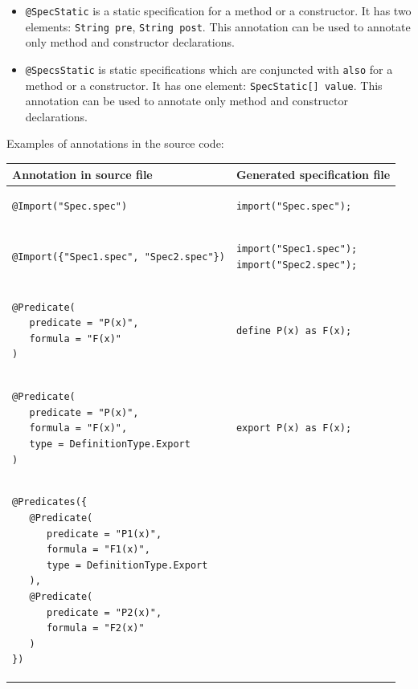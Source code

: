 \documentclass{article}
\begin{document}
\begin{itemize}
\item \texttt{@SpecStatic} is a static specification for a method or a constructor. It has two elements: \texttt{String pre}, \texttt{String post}. This annotation can be used to annotate only method and constructor declarations.
\item \texttt{@SpecsStatic} is static specifications which are conjuncted with \texttt{also} for a method or a constructor. It has one element: \texttt{SpecStatic[] value}. This annotation can be used to annotate only method and constructor declarations.
\end{itemize}


Examples of annotations in the source code:\\
\begin{longtable}{ m{7cm} | m{5cm} }
Annotation in source file & Generated specification file \\
\hline
\begin{verbatim}
@Import("Spec.spec")
\end{verbatim}
& 
\begin{verbatim}
import("Spec.spec");
\end{verbatim}
\\
\begin{verbatim}
@Import({"Spec1.spec", "Spec2.spec"})
\end{verbatim}
& 
\begin{verbatim}
import("Spec1.spec");
import("Spec2.spec");
\end{verbatim}
\\
\begin{verbatim}
@Predicate(
   predicate = "P(x)", 
   formula = "F(x)"
)
\end{verbatim} 
&
\begin{verbatim}
define P(x) as F(x);
\end{verbatim}
\\
\begin{verbatim}
@Predicate(
   predicate = "P(x)", 
   formula = "F(x)", 
   type = DefinitionType.Export
)
\end{verbatim}  
&
\begin{verbatim}
export P(x) as F(x);
\end{verbatim}\\
\begin{verbatim}
@Predicates({
   @Predicate(
      predicate = "P1(x)", 
      formula = "F1(x)", 
      type = DefinitionType.Export
   ),
   @Predicate(
      predicate = "P2(x)", 
      formula = "F2(x)"
   )
})
\end{verbatim} 

\end{longtable}
\end{document}
